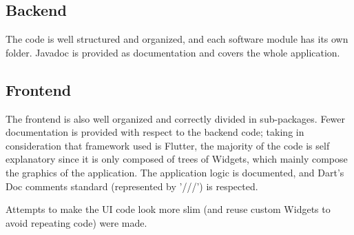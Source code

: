 \subsection{Backend}

The code is well structured and organized, and each software module has its own folder.
Javadoc is provided as documentation and covers the whole application.

\subsection{Frontend}

The frontend is also well organized and correctly divided in sub-packages.
Fewer documentation is provided with respect to the backend code; taking in consideration that framework used is Flutter, the majority of the code is self explanatory since it is only composed of trees of Widgets, which mainly compose the graphics of the application. The application logic is documented, and Dart's Doc comments standard (represented by '///') is respected.

Attempts to make the UI code look more slim (and reuse custom Widgets to avoid repeating code) were made.





